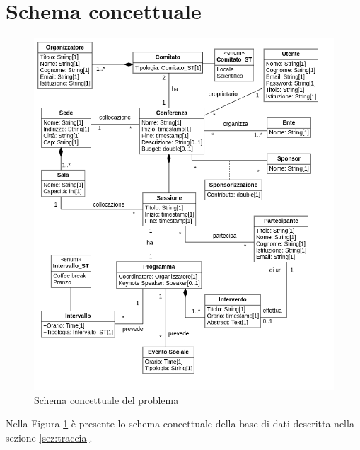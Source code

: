 \section{Schema concettuale}
\begin{figure}[h!]
\centering
\includegraphics[scale=0.6]{Immagini/Schema_Concettuale.png}
\caption{Schema concettuale del problema}\label{uml:schema_concettuale}
\end{figure}
Nella Figura \ref{uml:schema_concettuale} è presente lo schema concettuale della base di dati descritta nella sezione \ref{sez:traccia}.
\newpage
